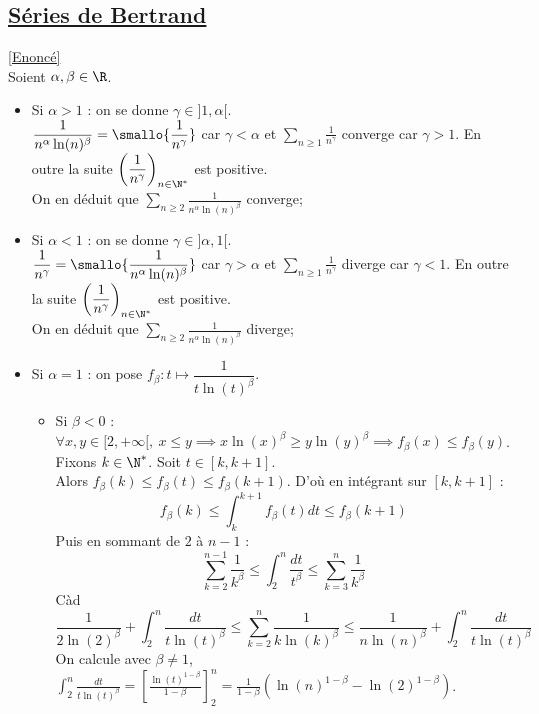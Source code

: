 \documentclass{book}
\begin{document}
	\subsection{\underline{Séries de Bertrand} }
	\label{sec:series-de-bertrand}
	\textcolor{blue}{\hyperref[Séries de Bertrand]{[Enoncé]}}\\
	Soient $\alpha,\beta\in \R$.
	\begin{itemize}
		\item Si $\alpha>1$ : on se donne $\gamma\in ]1,\alpha[$.\\
		$\dfrac{1}{n^\alpha\ln(n)^\beta}=\smallo{\dfrac{1}{n^\gamma}}$ car $\gamma<\alpha$ et $\displaystyle\sum_{n\geq 1}\frac{1}{n^\gamma}$ converge car $\gamma>1$. En outre la suite $\left(\dfrac{1}{n^\gamma}\right)_{n\in \N^*}$ est positive.\\
		On en déduit que $\displaystyle\sum_{n\geq 2}\frac{1}{n^\alpha\ln(n)^\beta}$ converge;
		\item Si $\alpha<1$ : on se donne $\gamma\in ]\alpha,1[$.\\
		$\dfrac{1}{n^\gamma}=\smallo{\dfrac{1}{n^\alpha\ln(n)^\beta}}$ car $\gamma>\alpha$ et $\displaystyle\sum_{n\geq 1}\frac{1}{n^\gamma}$ diverge car $\gamma<1$. En outre la suite $\left(\dfrac{1}{n^\gamma}\right)_{n\in \N^*}$ est positive.\\
		On en déduit que $\displaystyle\sum_{n\geq 2}\frac{1}{n^\alpha\ln(n)^\beta}$ diverge;
		\item Si $\alpha=1$ : on pose $f_\beta:t\mapsto\dfrac{1}{t\ln(t)^\beta}$.
		\begin{itemize}[label=\textbullet]
			\item Si $\beta<0$ : $\forall x,y\in [2,+\infty[,\ x\leq y\implies x\ln(x)^\beta\geq y\ln(y)^\beta\implies f_\beta(x)\leq f_\beta(y)$.\\
			Fixons $k\in \N^*$. Soit $t\in [k,k+1]$.\\
			Alors $f_\beta(k)\leq f_\beta(t)\leq f_\beta(k+1)$. D'où en intégrant sur $[k,k+1]$ :
			$$f_\beta(k)\leq \displaystyle\int_k^{k+1}f_\beta(t)dt\leq f_\beta(k+1)$$
			Puis en sommant de $2$ à $n-1$ :\\
			$$\sum_{k=2}^{n-1}\frac{1}{k^\beta}\leq \int_2^n\frac{dt}{t^\beta}\leq \sum_{k=3}^n\frac{1}{k^\beta}$$
			Càd
			$$\frac{1}{2\ln(2)^\beta}+\int_2^n\frac{dt}{t\ln(t)^\beta}\leq\sum_{k=2}^n\frac{1}{k\ln(k)^\beta}\leq \frac{1}{n\ln(n)^\beta}+\int_2^n\frac{dt}{t\ln(t)^\beta}$$
			On calcule avec $\beta\ne 1$, $\displaystyle\int_2^n\frac{dt}{t\ln(t)^\beta}=\left[\frac{\ln(t)^{1-\beta}}{1-\beta}\right]_2^n=\frac{1}{1-\beta}\left(\ln(n)^{1-\beta}-\ln(2)^{1-\beta}\right)$.\\

\end{itemize}
\end{itemize}
\end{document}
